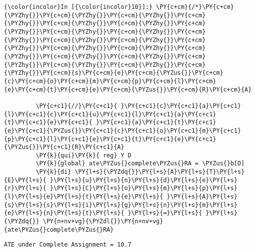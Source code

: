 \documentclass[11pt,notitlepage]{article}\usepackage[]{graphicx}\usepackage[]{color}
\makeatletter
\newenvironment{kframe}{%
 \def\at@end@of@kframe{}%
 \ifinner\ifhmode%
  \def\at@end@of@kframe{\end{minipage}}%
  \begin{minipage}{\columnwidth}%
 \fi\fi%
 \def\FrameCommand##1{\hskip\@totalleftmargin \hskip-\fboxsep
 \colorbox{shadecolor}{##1}\hskip-\fboxsep
     \hskip-\linewidth \hskip-\@totalleftmargin \hskip\columnwidth}%
 \MakeFramed {\advance\hsize-\width
   \@totalleftmargin\z@ \linewidth\hsize
   \@setminipage}}%
 {\par\unskip\endMakeFramed%
 \at@end@of@kframe}
\newenvironment{knitrout}{}{} %
\makeatother
\begin{document}
\begin{enumerate}[a)]
\begin{knitrout}
\begin{kframe}
    \begin{Verbatim}[commandchars=\\\{\}]
{\color{incolor}In [{\color{incolor}10}]:} \PY{c+cm}{/*}\PY{c+cm}{\PYZhy{}}\PY{c+cm}{\PYZhy{}}\PY{c+cm}{\PYZhy{}}\PY{c+cm}{\PYZhy{}}\PY{c+cm}{\PYZhy{}}\PY{c+cm}{\PYZhy{}}\PY{c+cm}{\PYZhy{}}\PY{c+cm}{\PYZhy{}}\PY{c+cm}{\PYZhy{}}\PY{c+cm}{\PYZhy{}}\PY{c+cm}{\PYZhy{}}\PY{c+cm}{\PYZhy{}}\PY{c+cm}{\PYZhy{}}\PY{c+cm}{\PYZhy{}}\PY{c+cm}{\PYZhy{}}\PY{c+cm}{\PYZhy{}}\PY{c+cm}{\PYZhy{}}\PY{c+cm}{\PYZhy{}}\PY{c+cm}{\PYZhy{}}\PY{c+cm}{\PYZhy{}}\PY{c+cm}{\PYZhy{}}\PY{c+cm}{\PYZhy{}}\PY{c+cm}{s}\PY{c+cm}{e}\PY{c+cm}{\PYZus{}}\PY{c+cm}{c}\PY{c+cm}{o}\PY{c+cm}{m}\PY{c+cm}{p}\PY{c+cm}{l}\PY{c+cm}{e}\PY{c+cm}{t}\PY{c+cm}{e}\PY{c+cm}{\PYZus{}}\PY{c+cm}{R}\PY{c+cm}{A}
         
         \PY{c+c1}{//}\PY{c+c1}{ }\PY{c+c1}{c}\PY{c+c1}{a}\PY{c+c1}{l}\PY{c+c1}{c}\PY{c+c1}{u}\PY{c+c1}{l}\PY{c+c1}{a}\PY{c+c1}{t}\PY{c+c1}{e}\PY{c+c1}{ }\PY{c+c1}{a}\PY{c+c1}{t}\PY{c+c1}{e}\PY{c+c1}{\PYZus{}}\PY{c+c1}{c}\PY{c+c1}{o}\PY{c+c1}{m}\PY{c+c1}{p}\PY{c+c1}{l}\PY{c+c1}{e}\PY{c+c1}{t}\PY{c+c1}{e}\PY{c+c1}{\PYZus{}}\PY{c+c1}{R}\PY{c+c1}{A}
         \PY{k}{qui}\PY{k}{ reg} Y D
         \PY{k}{global} ate\PYZus{}complete\PYZus{}RA = \PYZus{}b[D]
         \PY{k}{di} \PY{l+s}{\PYZdq{}}\PY{l+s}{A}\PY{l+s}{T}\PY{l+s}{E}\PY{l+s}{ }\PY{l+s}{u}\PY{l+s}{n}\PY{l+s}{d}\PY{l+s}{e}\PY{l+s}{r}\PY{l+s}{ }\PY{l+s}{C}\PY{l+s}{o}\PY{l+s}{m}\PY{l+s}{p}\PY{l+s}{l}\PY{l+s}{e}\PY{l+s}{t}\PY{l+s}{e}\PY{l+s}{ }\PY{l+s}{A}\PY{l+s}{s}\PY{l+s}{s}\PY{l+s}{i}\PY{l+s}{g}\PY{l+s}{n}\PY{l+s}{m}\PY{l+s}{e}\PY{l+s}{n}\PY{l+s}{t}\PY{l+s}{ }\PY{l+s}{=}\PY{l+s}{ }\PY{l+s}{\PYZdq{}} \PY{n+nv+vg}{\PYZdl{}}\PY{n+nv+vg}{ate\PYZus{}complete\PYZus{}RA}
\end{Verbatim}

    \begin{Verbatim}[commandchars=\\\{\}]
ATE under Complete Assignment = 10.7
    \end{Verbatim}


\end{kframe}
\end{knitrout}
\end{enumerate}
\end{document}
